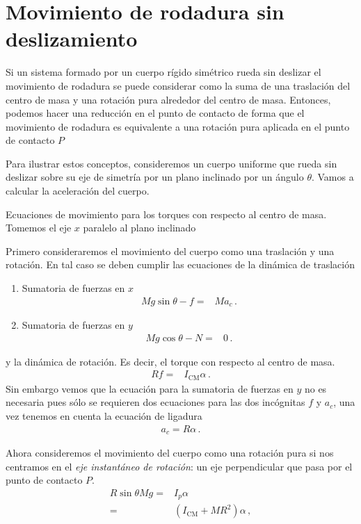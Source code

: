 \section{Movimiento de rodadura sin deslizamiento}

Si un sistema formado por un cuerpo rígido simétrico rueda sin
deslizar el movimiento de rodadura se puede considerar como la suma de
una traslación del centro de masa y una rotación pura alrededor del
centro de masa. 
Entonces, podemos hacer una reducción en el punto de contacto de forma
que el movimiento de rodadura es equivalente a una rotación pura
aplicada en el punto de contacto $P$



Para ilustrar estos conceptos, consideremos un cuerpo uniforme que
rueda sin deslizar sobre su eje de simetría por un plano inclinado por
un ángulo $\theta$. Vamos a calcular la aceleración del cuerpo.

Ecuaciones de movimiento para los torques con respecto al centro de
masa. Tomemos el eje $x$ paralelo al plano inclinado

Primero consideraremos el movimiento del cuerpo como una traslación y
una rotación. En tal caso se deben cumplir las ecuaciones de la
dinámica de traslación
\begin{enumerate}
\item Sumatoria de fuerzas en $x$ 
  \begin{align}
    \label{eq:fxcil}
    Mg\sin\theta-f=&M a_c\,.
  \end{align}
\item Sumatoria de fuerzas en $y$
  \begin{align*}
    Mg\cos\theta-N=&0\,.
  \end{align*}
\end{enumerate}
y la dinámica de rotación. Es decir, el torque con respecto al centro de masa. 
\begin{align}
  \label{eq:tcmcil}
  Rf=&I_{\text{CM}}\alpha\,.
\end{align}
Sin embargo vemos que la ecuación para la sumatoria de fuerzas en $y$ no es necesaria pues sólo se requieren dos ecuaciones para las dos incógnitas $f$ y $a_c$, una vez tenemos en cuenta la ecuación de ligadura
\begin{align}
  \label{eq:acal}
  a_c=R\alpha\,.
\end{align}

Ahora consideremos el movimiento del cuerpo como una rotación pura si nos centramos en  el \emph{eje instantáneo de rotación}: un eje perpendicular que pasa por el punto de contacto $P$. 
\begin{align*}
  R\sin\theta M g=&I_p\alpha\nonumber\\
  =&(I_{\text{CM}}+MR^2)\alpha\,,
\end{align*}

